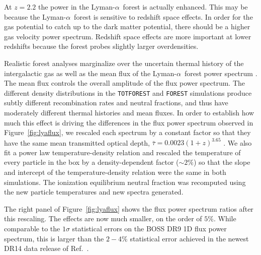 \documentclass[a4paper,11pt]{article}
\newcommand{\Lya}{Lyman-$\alpha$}
\begin{document}
At $z=2.2$ the power in the \Lya~forest is actually enhanced. This may be because the \Lya~forest is sensitive to redshift space effects. In order for the gas potential to catch up to the dark matter potential, there should be a higher gas velocity power spectrum. Redshift space effects are more important at lower redshifts because the forest probes slightly larger overdensities.

Realistic forest analyses marginalize over the uncertain thermal history of the intergalactic gas as well as the mean flux of the \Lya~forest power spectrum \citep[e.g.][]{PD2013}. The mean flux controls the overall amplitude of the flux power spectrum. The different density distributions in the \texttt{TOTFOREST} and \texttt{FOREST} simulations produce subtly different recombination rates and neutral fractions, and thus have moderately different thermal histories and mean fluxes. In order to establish how much this effect is driving the differences in the flux power spectrum observed in Figure~\ref{fig:lyaflux}, we rescaled each spectrum by a constant factor so that they have the same mean transmitted optical depth, $\bar{\tau} = 0.0023 (1 + z)^{3.65}$ \cite{Kim:2007}. We also fit a power law temperature-density relation and rescaled the temperature of every particle in the box by a density-dependent factor ($\sim 2\%$) so that the slope and intercept of the temperature-density relation were the same in both simulations. The ionization equilibrium neutral fraction was recomputed using the new particle temperatures and new spectra generated.

The right panel of Figure~\ref{fig:lyaflux} shows the flux power spectrum ratios after this rescaling. The effects are now much smaller, on the order of $5\%$. While comparable to the $1\sigma$ statistical errors on the BOSS DR9 1D flux power spectrum, this is larger than the $2-4\%$ statistical error achieved in the newest DR14 data release of Ref.~\cite{Chabanier:2019}.

\end{document}
